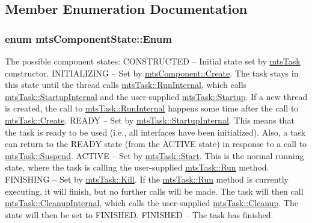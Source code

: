 \subsection{Member Enumeration Documentation}
\hypertarget{classmts_component_state_a1158e4d2d79fff671354909e87f58928}{
\subsubsection[{Enum}]{\setlength{\rightskip}{0pt plus 5cm}enum {\bf mts\-Component\-State\-::\-Enum}}}\label{classmts_component_state_a1158e4d2d79fff671354909e87f58928}
The possible component states\-: C\-O\-N\-S\-T\-R\-U\-C\-T\-E\-D -- Initial state set by \hyperlink{classmts_task}{mts\-Task} constructor. I\-N\-I\-T\-I\-A\-L\-I\-Z\-I\-N\-G -- Set by \hyperlink{classmts_component_a7e8a723ce2fa2ed12b2fb4095ca6feec}{mts\-Component\-::\-Create}. The task stays in this state until the thread calls \hyperlink{classmts_task_affcd896841ecfe785f898ef93a4202e9}{mts\-Task\-::\-Run\-Internal}, which calls \hyperlink{classmts_task_a6816f8dfc6124376896318ebcdd4832b}{mts\-Task\-::\-Startup\-Internal} and the user-\/supplied \hyperlink{classmts_component_aaf28f0262b44eb6866e10089a02fa6e4}{mts\-Task\-::\-Startup}. If a new thread is created, the call to \hyperlink{classmts_task_affcd896841ecfe785f898ef93a4202e9}{mts\-Task\-::\-Run\-Internal} happens some time after the call to \hyperlink{classmts_task_aa051581f8b5c35105d595d7a46ccbe17}{mts\-Task\-::\-Create}. R\-E\-A\-D\-Y -- Set by \hyperlink{classmts_task_a6816f8dfc6124376896318ebcdd4832b}{mts\-Task\-::\-Startup\-Internal}. This means that the task is ready to be used (i.\-e., all interfaces have been initialized). Also, a task can return to the R\-E\-A\-D\-Y state (from the A\-C\-T\-I\-V\-E state) in response to a call to \hyperlink{classmts_component_a7264642eb5c56729d1f80263e0e1152b}{mts\-Task\-::\-Suspend}. A\-C\-T\-I\-V\-E -- Set by \hyperlink{classmts_component_abfb4a63739ec45a9cdb91e3363db7c5c}{mts\-Task\-::\-Start}. This is the normal running state, where the task is calling the user-\/supplied \hyperlink{classmts_task_a20e18c9479cb650792456c32ee689834}{mts\-Task\-::\-Run} method. F\-I\-N\-I\-S\-H\-I\-N\-G -- Set by \hyperlink{classmts_task_a67a15d7fffef28708b813e2ea624e4f8}{mts\-Task\-::\-Kill}. If the \hyperlink{classmts_task_a20e18c9479cb650792456c32ee689834}{mts\-Task\-::\-Run} method is currently executing, it will finish, but no further calls will be made. The task will then call \hyperlink{classmts_task_aba518c256e0c623e1e826cc7c76fe8eb}{mts\-Task\-::\-Cleanup\-Internal}, which calls the user-\/supplied \hyperlink{classmts_component_a891f330f4fde7d831dcf7dc537dc5e81}{mts\-Task\-::\-Cleanup}. The state will then be set to F\-I\-N\-I\-S\-H\-E\-D. F\-I\-N\-I\-S\-H\-E\-D -- The task has finished. \begin{Desc}

\end{Desc}
